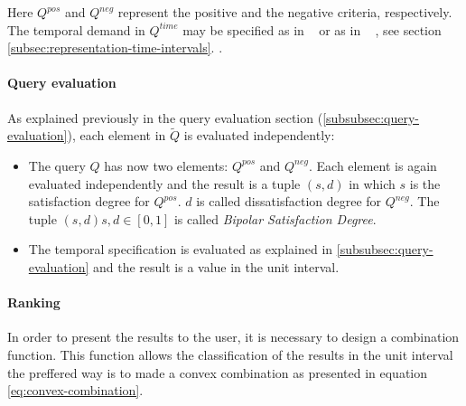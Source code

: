 Here $Q^{pos}$ and $Q^{neg}$ represent the positive and the negative criteria, respectively. The temporal demand in $Q^{time}$ may be specified as in ~\cite{garrido2009} or as in ~ \cite{Pon11}, see section \ref{subsec:representation-time-intervals}.
.
\paragraph{Query evaluation}
As explained previously in the query evaluation section (\ref{subsubsec:query-evaluation}), each element in $\tilde{Q}$ is evaluated independently:

\begin{itemize}
\item
The query $Q$ has now two elements: $Q^{pos}$ and $Q^{neg}$. Each element is again evaluated independently and the result is a tuple $\left(s,d \right)$ in which $s$ is the satisfaction degree for $Q^{pos}$. $d$ is called dissatisfaction degree for $Q^{neg}$. The tuple $\left(s,d \right) s,d \in \left[0,1 \right]$ is called \emph{Bipolar Satisfaction Degree}.
\item
The temporal specification is evaluated as explained in \ref{subsubsec:query-evaluation} and the result is a value in the unit interval.
\end{itemize}

\paragraph{Ranking}
In order to present the results to the user, it is necessary to design a combination function. This function allows the classification of the results in the unit interval the preffered way is to made a convex combination as  presented in equation \eqref{eq:convex-combination}.


